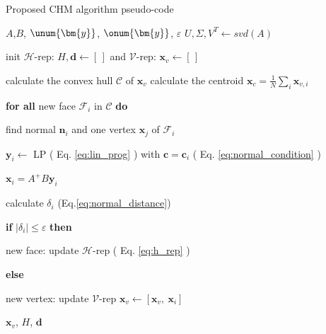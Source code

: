 \begin{algorithm}[!h]
\caption{Proposed CHM algorithm pseudo-code}
\begin{algorithmic}
\REQUIRE $A$,$B$, $\unum{\bm{y}}$, $\onum{\bm{y}}$, $\varepsilon$
\STATE $U, \Sigma, V^T \leftarrow svd(A)$ 

\STATE init $\mathcal{H}$-rep: $H,\bm{d} \leftarrow [\,]$ and $\mathcal{V}$-rep: $\bm{x}_v\leftarrow [\,]$
\REPEAT

\STATE calculate the convex hull $\mathcal{C}$ of $\bm{x}_{v}$
\STATE calculate the centroid $\bm{x}_{c} = \frac{1}{N}\sum_i\bm{x}_{v,i}$

\STATE \textbf{for all}   {new face $\mathcal{F}_i$ in $\mathcal{C}$} \textbf{do}

\hspace{0.25cm} find normal $\bm{n}_i$ and one vertex $\bm{x}_{j}$ of $\mathcal{F}_i$

\hspace{0.25cm} $\bm{y}_{i}\leftarrow$ LP ( Eq. \ref{eq:lin_prog} ) with  $\bm{c}\! =\! \bm{c}_i$ ( Eq. \ref{eq:normal_condition} )

\hspace{0.25cm} $\bm{x}_{i} = A^+B\bm{y}_i$ 

\hspace{0.25cm}  calculate $\delta_i$ (Eq.\ref{eq:normal_distance})

\hspace{0.25cm}  \textbf{if}   $ |\delta_i| \leq \varepsilon$ \textbf{then} 

\hspace{0.6cm}  new face: update $\mathcal{H}$-rep  ( Eq. \ref{eq:h_rep} )

\hspace{0.25cm}  \textbf{else}

\hspace{0.6cm} new vertex: update $\mathcal{V}$-rep $\bm{x}_{v} \!\leftarrow\! [\bm{x}_{v},~ \bm{x}_i ]$ 

{}
\RETURN $\bm{x}_v$, $H$, $\bm{d}$ 
\end{algorithmic}
\label{alg:main_algo}
\end{algorithm}

